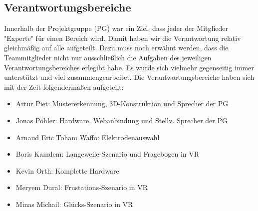 \begin{figure}[h]
\end{figure} 



\subsection{Verantwortungsbereiche}
Innerhalb der Projektgruppe (PG) war ein Ziel, dass jeder der Mitglieder "Experte" f{\"u}r einen Bereich wird. Damit haben wir die Verantwortung relativ gleichm{\"a}{\ss}ig auf alle aufgeteilt. Dazu muss noch erw{\"a}hnt werden, dass die Teammitglieder nicht nur ausschlie{\ss}lich die Aufgaben des jeweiligen Verantwortungsbereiches erlegibt habe. Es wurde sich vielmehr gegenseitig immer unterst{\"u}tzt und viel zusammengearbeitet. Die Verantwortungsbereiche haben sich mit der Zeit folgenderma{\ss}en aufgeteilt:

\begin{itemize} \setlength\itemsep{-0.15cm}
  \item Artur Piet: Mustererkennung, 3D-Konstruktion und Sprecher der PG
  \item Jonas P{\"o}hler: Hardware, Webanbindung und Stellv. Sprecher der PG
  \item Arnaud Eric Toham Waffo: Elektrodenauswahl
  \item Boris Kamdem: Langeweile-Szenario und Fragebogen in VR
  \item Kevin Orth: Komplette Hardware
  \item Meryem Dural: Frustations-Szenario in VR
  \item Minas Michail: Gl{\"u}cks-Szenario in VR
\end{itemize}




